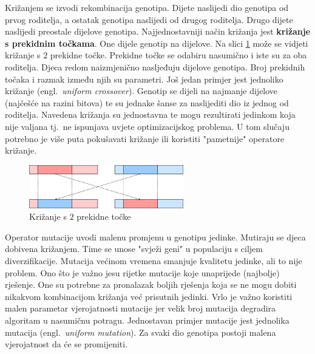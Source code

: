 \documentclass[times, utf8, diplomski]{fer}
\begin{document}
Križanjem se izvodi rekombinacija genotipa. Dijete naslijedi dio genotipa od prvog roditelja, a ostatak genotipa naslijedi od drugog roditelja. Drugo dijete naslijedi preostale dijelove genotipa. Najjednostavniji način križanja jest \textbf{križanje s prekidnim točkama}. One dijele genotip na dijelove. Na slici \ref{fig:crossover} može se vidjeti križanje s $2$ prekidne točke. Prekidne točke se odabiru nasumično i iste su za oba roditelja. Djeca redom naizmjenično nasljeđuju dijelove genotipa. Broj prekidnih točaka i razmak između njih su parametri. Još jedan primjer jest jednoliko križanje (engl.~\textit{uniform crossover}). Genotip se dijeli na najmanje dijelove (najčešće na razini bitova) te su jednake šanse za naslijediti dio iz jednog od roditelja. Navedena križanja su jednostavna te mogu rezultirati jedinkom koja nije valjana tj.~ne ispunjava uvjete optimizacijskog problema. U tom slučaju potrebno je više puta pokušavati križanje ili koristiti "pametnije" operatore križanje.

\begin{figure}[htb]
	\centering
	\includegraphics[width=0.6\textwidth]{img/crossover.png}
	\caption{Križanje s $2$ prekidne točke}
	\label{fig:crossover}
\end{figure}

Operator mutacije uvodi malenu promjenu u genotipu jedinke. Mutiraju se djeca dobivena križanjem. Time se unose "svježi geni" u populaciju s ciljem diverzifikacije. Mutacija većinom vremena smanjuje kvalitetu jedinke, ali to nije problem. Ono što je važno jesu rijetke mutacije koje unaprijede (najbolje) rješenje. One su potrebne za pronalazak boljih rješenja koja se ne mogu dobiti nikakvom kombinacijom križanja već prisutnih jedinki. Vrlo je važno koristiti malen parametar vjerojatnosti mutacije jer velik broj mutacija degradira algoritam u nasumičnu potragu. Jednostavan primjer mutacije jest jednolika mutacija (engl.~\textit{uniform mutation}). Za svaki dio genotipa postoji malena vjerojatnost da će se promijeniti.
\end{document}
